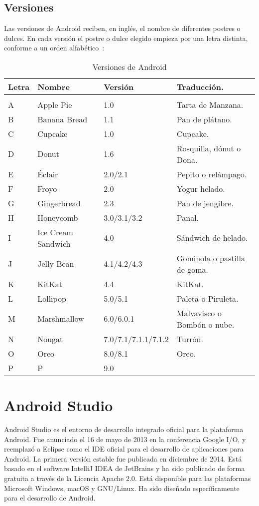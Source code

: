 \subsection{Versiones}
Las versiones de Android reciben, en inglés, el nombre de diferentes postres o dulces. En cada versión el postre o dulce elegido empieza por una letra distinta, conforme a un orden alfabético~\cite{wiki:android}:
\begin{table}[]
	\centering
	\caption{Versiones de Android}
	\label{tabla:versionesAndroid}
	\begin{tabular}{l l l l}
	\toprule
	Letra     & Nombre 		& Versión             & Traducción.\\ 	\midrule    \\ 	
	A         & Apple Pie   & 1.0           	  & Tarta de Manzana.\\ 
	B         & Banana Bread   & 1.1           	  & Pan de plátano.\\ 
	C         & Cupcake   	& 1.0           	  & Cupcake.\\ 
	D         & Donut   	& 1.6           	  & Rosquilla, dónut o Dona.\\ 
	E         & Éclair		& 2.0/2.1             & Pepito o relámpago.\\ 
	F         & Froyo		& 2.0           	  & Yogur helado.\\ 
	G         & Gingerbread & 2.3           	  & Pan de jengibre.\\ 
	H         & Honeycomb   & 3.0/3.1/3.2     	  & Panal.\\ 
	I         & Ice Cream Sandwich    & 4.0       & Sándwich de helado.\\ 
	J         & Jelly Bean    & 4.1/4.2/4.3       & Gominola o pastilla de goma.\\
	K         & KitKat    	& 4.4           	  & KitKat.\\ 
	L         & Lollipop    & 5.0/5.1             & Paleta o Piruleta.\\ 
	M         & Marshmallow & 6.0/6.0.1           & Malvavisco o Bombón o nube.\\ 
	N         & Nougat    	& 7.0/7.1/7.1.1/7.1.2 & Turrón.\\ 
	O         & Oreo    	& 8.0/8.1             & Oreo.\\ 
	P         & P		    & 9.0           	  &  
\\ \bottomrule
\end{tabular}
\end{table}
\newpage
\section{Android Studio}
Android Studio es el entorno de desarrollo integrado oficial para la plataforma Android. Fue anunciado el 16 de mayo de 2013 en la conferencia Google I/O, y reemplazó a Eclipse como el IDE oficial para el desarrollo de aplicaciones para Android. La primera versión estable fue publicada en diciembre de 2014.
Está basado en el software IntelliJ IDEA de JetBrains y ha sido publicado de forma gratuita a través de la Licencia Apache 2.0. Está disponible para las plataformas Microsoft Windows, macOS y GNU/Linux. Ha sido diseñado específicamente para el desarrollo de Android.
